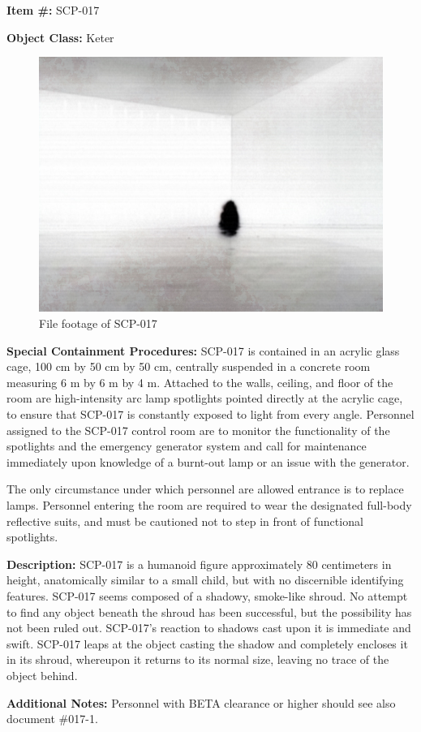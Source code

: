 
\textbf{Item \#:} SCP-017

\textbf{Object Class:} Keter

\begin{figure}[h]
\begin{center}
\includegraphics[scale=0.5]{scp/017.jpg}
\linebreak File footage of SCP-017
\end{center}
\end{figure}

\textbf{Special Containment Procedures:} SCP-017 is contained in an acrylic glass cage, 100 cm by 50 cm by 50 cm, centrally suspended in a concrete room measuring 6 m by 6 m by 4 m. Attached to the walls, ceiling, and floor of the room are high-intensity arc lamp spotlights pointed directly at the acrylic cage, to ensure that SCP-017 is constantly exposed to light from every angle. Personnel assigned to the SCP-017 control room are to monitor the functionality of the spotlights and the emergency generator system and call for maintenance immediately upon knowledge of a burnt-out lamp or an issue with the generator.

The only circumstance under which personnel are allowed entrance is to replace lamps. Personnel entering the room are required to wear the designated full-body reflective suits, and must be cautioned not to step in front of functional spotlights.

\textbf{Description:} SCP-017 is a humanoid figure approximately 80 centimeters in height, anatomically similar to a small child, but with no discernible identifying features. SCP-017 seems composed of a shadowy, smoke-like shroud. No attempt to find any object beneath the shroud has been successful, but the possibility has not been ruled out.
\newpage
SCP-017's reaction to shadows cast upon it is immediate and swift. SCP-017 leaps at the object casting the shadow and completely encloses it in its shroud, whereupon it returns to its normal size, leaving no trace of the object behind.

\textbf{Additional Notes:} Personnel with BETA clearance or higher should see also document \#017-1.